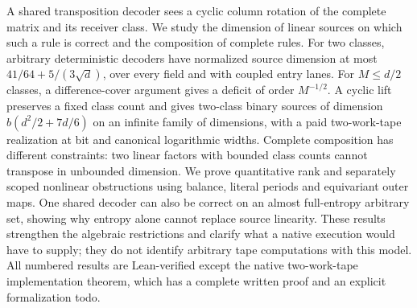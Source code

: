 A shared transposition decoder sees a cyclic column rotation of the complete
matrix and its receiver class. We study the dimension of linear sources
on which such a rule is correct and the composition of complete rules.
For two classes, arbitrary deterministic decoders have normalized source
dimension at most $41/64+5/(3\sqrt d)$, over every field and with coupled
entry lanes. For $M\le d/2$ classes, a difference-cover argument gives a
deficit of order $M^{-1/2}$. A cyclic lift preserves a fixed class count and
gives two-class binary sources of dimension $b(d^2/2+7d/6)$ on an infinite
family of dimensions, with a paid two-work-tape realization at bit and
canonical logarithmic widths. Complete composition has different constraints:
two linear factors with bounded class counts cannot transpose in unbounded
dimension. We prove quantitative rank and separately scoped nonlinear
obstructions using balance, literal periods and equivariant outer maps.
One shared decoder can also be correct on an almost full-entropy arbitrary
set, showing why entropy alone cannot replace source linearity.
These results strengthen the algebraic restrictions and clarify what a
native execution would have to supply; they do not identify arbitrary tape
computations with this model. All numbered results are Lean-verified except
the native two-work-tape implementation theorem, which has a complete written
proof and an explicit formalization todo.
